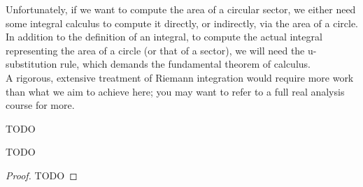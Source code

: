 \documentclass[solutions.tex]{subfiles}
\begin{document}
Unfortunately, if we want to compute the area of a circular sector,
we either need some integral calculus to compute it directly, or indirectly,
via the area of a circle. In addition to the definition of an integral,
to compute the actual integral representing the area of a circle (or
that of a sector), we will need the u-substitution rule, which demands
the fundamental theorem of calculus. \\

A rigorous, extensive treatment of Riemann integration would require
more work than what we aim to achieve here; you may want to refer to
a full real analysis course for more.



\begin{definition}
TODO
\end{definition}

\begin{theorem}
TODO
\end{theorem}
\begin{proof}
TODO
\end{proof}


\end{document}
